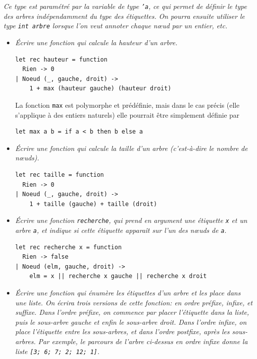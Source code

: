 \documentclass[11pt, a4paper]{article}
\begin{document}
\emph{Ce type est \emph{paramétré} par la variable de type
\texttt{'a}, ce qui permet de définir le type des arbres
indépendamment du type des étiquettes. On pourra ensuite utiliser le
type {\tt int arbre} lorsque l'on veut annoter chaque nœud par un
entier, etc.}
\begin{itemize}

  \item \emph{Écrire une fonction qui calcule la hauteur d'un arbre.}

    \smallskip

\begin{verbatim}
let rec hauteur = function
  Rien -> 0
| Noeud (_, gauche, droit) ->
    1 + max (hauteur gauche) (hauteur droit)
\end{verbatim}

    La fonction \texttt{max} est polymorphe et prédéfinie, mais dans
    le cas précis (elle s'applique à des entiers naturels) elle
    pourrait être simplement définie par

\begin{verbatim}
let max a b = if a < b then b else a
\end{verbatim}

    \smallskip

    \item \emph{Écrire une fonction qui calcule la taille d'un arbre
    (c'est-à-dire le nom\-bre de nœuds).}

    \smallskip

\begin{verbatim}
let rec taille = function
  Rien -> 0
| Noeud (_, gauche, droit) ->
    1 + taille (gauche) + taille (droit)
\end{verbatim}

               \smallskip

         \item \emph{Écrire une fonction {\tt recherche}, qui prend en
               argument une étiquette {\tt x} et un arbre {\tt a}, et
               indique si cette étiquette apparaît sur l'un des nœuds
               de {\tt a}.}

               \smallskip

               \begin{verbatim}
let rec recherche x = function
  Rien -> false
| Noeud (elm, gauche, droit) ->
    elm = x || recherche x gauche || recherche x droit
               \end{verbatim}

  \item \emph{Écrire une fonction qui énumère les étiquettes d'un
        arbre et les place dans une liste. On écrira trois versions de
        cette fonction: en ordre préfixe, infixe, et suffixe. Dans
        l'ordre préfixe, on commence par placer l'étiquette dans la
        liste, puis le sous-arbre gauche et enfin le sous-arbre
        droit. Dans l'ordre infixe, on place l'étiquette entre les
        sous-arbres, et dans l'ordre postfixe, après les
        sous-arbres. Par exemple, le parcours de l'arbre ci-dessus en
        ordre infixe donne la liste \texttt{[3; 6; 7; 2; 12; 1]}.}


\end{itemize}
\end{document}
